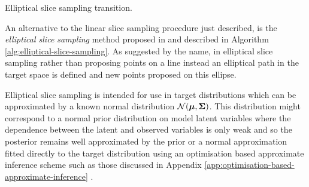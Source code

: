 \begin{algorithm}[!t]
\caption{Elliptical slice sampling transition.}
\label{alg:elliptical-slice-sampling}

\end{algorithm}

An alternative to the linear slice sampling procedure just described, is the \emph{elliptical slice sampling} method proposed in \citep{murray2010elliptical} and described in Algorithm \ref{alg:elliptical-slice-sampling}. As suggested by the name, in elliptical slice sampling rather than proposing points on a line instead an elliptical path in the target space is defined and new points proposed on this ellipse. 

Elliptical slice sampling is intended for use in target distributions which can be approximated by a known normal distribution $\nrm{\vct{\mu},\mtx{\Sigma}}$. This distribution might correspond to a normal prior distribution on model latent variables where the dependence between the latent and observed variables is only weak and so the posterior remains well approximated by the prior or a normal approximation fitted directly to the target distribution using an optimisation based approximate inference scheme such as those discussed in Appendix \ref{app:optimisation-based-approximate-inference} \citep{nishihara2014parallel}. 

